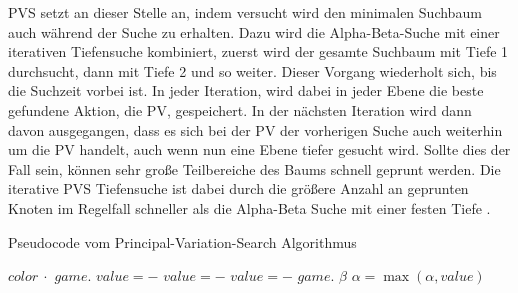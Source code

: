 \acl{PVS} setzt an dieser Stelle an, indem versucht wird den minimalen Suchbaum auch während der Suche zu erhalten. Dazu wird die Alpha-Beta-Suche mit einer iterativen Tiefensuche kombiniert, \dash zuerst wird der gesamte Suchbaum mit Tiefe 1 durchsucht, dann mit Tiefe 2 und so weiter. Dieser Vorgang wiederholt sich, bis die Suchzeit vorbei ist. In jeder Iteration, wird dabei in jeder Ebene die beste gefundene Aktion, die \acl{PV}, gespeichert. In der nächsten Iteration wird dann davon ausgegangen, dass es sich bei der \acl{PV} der vorherigen Suche auch weiterhin um die \acl{PV} handelt, auch wenn nun eine Ebene tiefer gesucht wird. Sollte dies der Fall sein, können sehr große Teilbereiche des Baums schnell geprunt werden. Die iterative \ac{PVS} Tiefensuche ist dabei durch die größere Anzahl an geprunten Knoten im Regelfall schneller als die Alpha-Beta Suche mit einer festen Tiefe \cite[S. 13]{2017.Minimax}.

\begingroup

\setlength{\textfloatsep}{0pt}
\setlength{\intextsep}{0pt}


\begin{algorithm}[!ht]
    \caption{Pseudocode vom Principal-Variation-Search Algorithmus}
    \label{algo:principal-varation-search}
    \begin{algorithmic}[1]
        \State \Return $color\ \cdot $  
        \EndIf
        \State $game.$
         
        \State $value = -$ \label{alg:pvs-line-8}
        \Else
        \State $value = -$  \label{alg:pvs-line-10}
        \State $value = -$ \label{alg:pvs-line-12}
        \EndIf
        \EndIf
        \State $game.$
        \State \Return $\beta$ 
        \EndIf
        \State $\alpha = \max\left(\alpha, value\right)$ \label{alg:pvs-line-19}
        \EndFor
        \EndFunction
    \end{algorithmic}
\end{algorithm}

